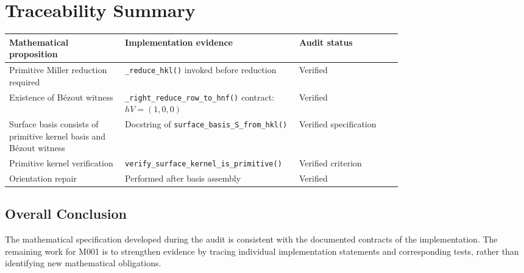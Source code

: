 
\section{Traceability Summary}

\begin{center}
\begin{tabular}{|p{0.27\linewidth}|p{0.24\linewidth}|p{0.24\linewidth}|}
\hline
Mathematical proposition & Implementation evidence & Audit status\\
\hline
Primitive Miller reduction required &
\texttt{\_reduce\_hkl()} invoked before reduction &
Verified\\
\hline
Existence of Bézout witness &
\texttt{\_right\_reduce\_row\_to\_hnf()} contract:
$hV=(1,0,0)$ &
Verified\\
\hline
Surface basis consists of primitive kernel basis and Bézout witness &
Docstring of
\texttt{surface\_basis\_S\_from\_hkl()} &
Verified specification\\
\hline
Primitive kernel verification &
\texttt{verify\_surface\_kernel\_is\_primitive()} &
Verified criterion\\
\hline
Orientation repair &
Performed after basis assembly &
Verified\\
\hline
\end{tabular}
\end{center}

\subsection{Overall Conclusion}

The mathematical specification developed during the audit is consistent
with the documented contracts of the implementation. The remaining work
for M001 is to strengthen evidence by tracing individual implementation
statements and corresponding tests, rather than identifying new
mathematical obligations.

